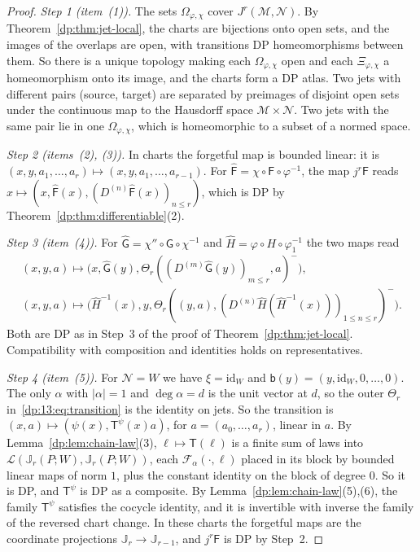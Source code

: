 \documentclass[11pt]{amsart}
\theoremstyle{definition}
\theoremstyle{remark}
\numberwithin{equation}{section}
\newcommand{\cL}{\mathcal L}
\newcommand{\id}{\mathrm{id}}
\newcommand{\abs}[1]{\lvert #1\rvert}
\theoremstyle{plain}
\theoremstyle{definition}
\theoremstyle{plain}
\begin{document}
\begin{proof}
\emph{Step 1 (item~(1)).} The sets $\Omega_{\varphi,\chi}$ cover $J^r(\mathcal M,\mathcal N)$. By Theorem~\ref{dp:thm:jet-local}, the charts are bijections onto open sets, and the images of the overlaps are open, with transitions DP homeomorphisms between them. So there is a unique topology making each $\Omega_{\varphi,\chi}$ open and each $\Xi_{\varphi,\chi}$ a homeomorphism onto its image, and the charts form a DP atlas. Two jets with different pairs (source, target) are separated by preimages of disjoint open sets under the continuous map to the Hausdorff space $\mathcal M\times\mathcal N$. Two jets with the same pair lie in one $\Omega_{\varphi,\chi}$, which is homeomorphic to a subset of a normed space.

\emph{Step 2 (items~(2), (3)).} In charts the forgetful map is bounded linear: it is $(x,y,a_1,\dots,a_r)\mapsto(x,y,a_1,\dots,a_{r-1})$. For $\hat{\mathsf F}=\chi\circ\mathsf F\circ\varphi^{-1}$, the map $j^r\mathsf F$ reads $x\mapsto(x,\hat{\mathsf F}(x),(D^{(n)}\hat{\mathsf F}(x))_{n\le r})$, which is DP by Theorem~\ref{dp:thm:differentiable}(2).

\emph{Step 3 (item~(4)).} For $\hat{\mathsf G}=\chi''\circ\mathsf G\circ\chi^{-1}$ and $\hat H=\varphi\circ H\circ\varphi_1^{-1}$ the two maps read
\begin{gather*}
 (x,y,a)\mapsto\bigl(x,\hat{\mathsf G}(y),\Theta_r((D^{(m)}\hat{\mathsf G}(y))_{m\le r},a)^-\bigr),\\
 (x,y,a)\mapsto\bigl(\hat H^{-1}(x),y,\Theta_r((y,a),(D^{(n)}\hat H(\hat H^{-1}(x)))_{1\le n\le r})^-\bigr).
\end{gather*}
Both are DP as in Step~3 of the proof of Theorem~\ref{dp:thm:jet-local}. Compatibility with composition and identities holds on representatives.

\emph{Step 4 (item~(5)).} For $\mathcal N=W$ we have $\xi=\id_W$ and $\mathsf b(y)=(y,\id_W,0,\dots,0)$. The only $\alpha$ with $\abs\alpha=1$ and $\deg\alpha=d$ is the unit vector at $d$, so the outer $\Theta_r$ in~\eqref{dp:13:eq:transition} is the identity on jets. So the transition is $(x,a)\mapsto(\psi(x),\mathsf T^\psi(x)a)$, for $a=(a_0,\dots,a_r)$, linear in $a$. By Lemma~\ref{dp:lem:chain-law}(3), $\ell\mapsto\mathsf T(\ell)$ is a finite sum of laws into $\cL(\mathbb J_r(P;W),\mathbb J_r(P;W))$, each $\mathcal F_\alpha({\cdot},\ell)$ placed in its block by bounded linear maps of norm $1$, plus the constant identity on the block of degree $0$. So it is DP, and $\mathsf T^\psi$ is DP as a composite. By Lemma~\ref{dp:lem:chain-law}(5),(6), the family $\mathsf T^\psi$ satisfies the cocycle identity, and it is invertible with inverse the family of the reversed chart change. In these charts the forgetful maps are the coordinate projections $\mathbb J_r\to\mathbb J_{r-1}$, and $j^r\mathsf F$ is DP by Step~2.
\end{proof}
\end{document}
